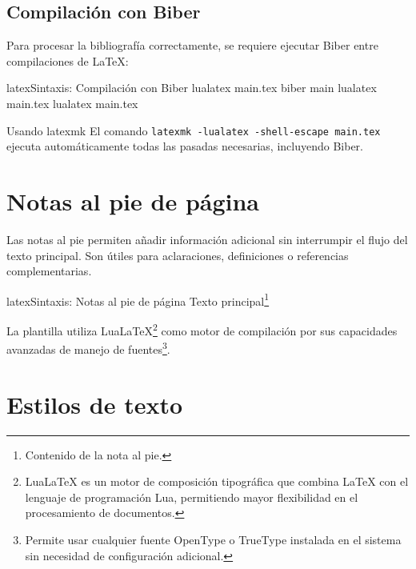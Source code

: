 \subsection{Compilación con Biber}
\label{subsec:compilacion-biber}

Para procesar la bibliografía correctamente, se requiere ejecutar Biber
entre compilaciones de \LaTeX{}:

\begin{codigosimple}{latex}{Sintaxis: Compilación con Biber}
lualatex main.tex    %
biber main           %
lualatex main.tex    %
lualatex main.tex    %
\end{codigosimple}

\begin{infobox}{Usando latexmk}
  El comando \texttt{latexmk -lualatex -shell-escape main.tex} ejecuta
  automáticamente todas las pasadas necesarias, incluyendo Biber.
\end{infobox}

\section{Notas al pie de página}
\label{sec:notas-pie}

Las notas al pie permiten añadir información adicional sin interrumpir
el flujo del texto principal. Son útiles para aclaraciones, definiciones
o referencias complementarias.

\begin{codigosimple}{latex}{Sintaxis: Notas al pie de página}
Texto principal\footnote{Contenido de la nota al pie.}
\end{codigosimple}

La plantilla utiliza LuaLaTeX\footnote{LuaLaTeX es un motor de composición tipográfica que combina \LaTeX{} con el lenguaje de programación Lua, permitiendo mayor flexibilidad en el procesamiento de documentos.} como motor de compilación por sus capacidades avanzadas de manejo de fuentes\footnote{Permite usar cualquier fuente OpenType o TrueType instalada en el sistema sin necesidad de configuración adicional.}.

\section{Estilos de texto}
\label{sec:estilos-texto}

